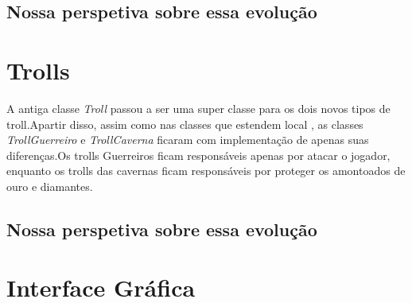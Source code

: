 \documentclass[runningheads,a4paper]{llncs}
\begin{document}
    \subsection{Nossa perspetiva sobre essa evolução}

\section{Trolls}
    A antiga classe \emph{Troll} passou a ser uma super classe para os dois novos tipos de troll.Apartir disso, assim como nas classes que estendem local , as classes \emph{TrollGuerreiro} e \emph{TrollCaverna} ficaram com implementação de apenas suas diferenças.Os trolls Guerreiros ficam responsáveis apenas por atacar o jogador, enquanto os trolls das cavernas ficam responsáveis por proteger os amontoados de ouro e diamantes. 

    \subsection{Nossa perspetiva sobre essa evolução}
    
\section{Interface Gráfica}
    
    

\nocite{*} 
\end{document}

